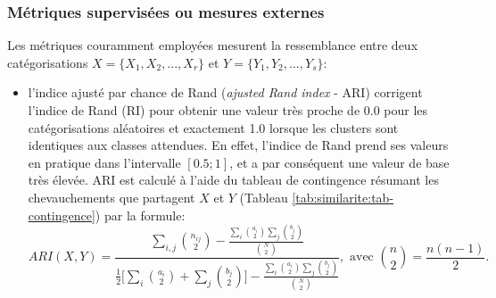 \subsubsection{Métriques supervisées ou mesures externes}
\label{sec:similarite:biblio:supeval}
Les métriques couramment employées mesurent la ressemblance entre deux catégorisations $X = \lbrace X_1, X_2,..., X_r \rbrace$ et $Y = \lbrace Y_1,Y_2,..., Y_s \rbrace$:
\begin{itemize}
	\item l'indice ajusté par chance de Rand (\textit{ajusted Rand index} - ARI) \citep{hubert1985adjustedrandidx} corrigent l'indice de Rand (RI) \citep{rand1971randidx} pour obtenir une valeur très proche de 0.0 pour les catégorisations aléatoires et exactement 1.0 lorsque les clusters sont identiques aux classes attendues. En effet, l'indice de Rand prend ses valeurs en pratique dans l'intervalle $[0.5;1]$, et a par conséquent une valeur de base très élevée. ARI est calculé à l'aide du tableau de contingence résumant les chevauchements que partagent $X$ et $Y$ (Tableau \ref{tab:similarite:tab-contingence}) par la formule: %
	\[ARI(X,Y) = \frac{\sum\limits_{i,j}\binom{n_{ij}}{2} - \frac{\sum\limits_{i}\binom{a_{i}}{2}\sum\limits_{j}\binom{b_{j}}{2}}{\binom{N}{2}}}{\frac{1}{2}\big[\sum\limits_{i}\binom{a_{i}}{2}+\sum\limits_{j}\binom{b_{j}}{2}\big] - \frac{\sum\limits_{i}\binom{a_{i}}{2}\sum\limits_{j}\binom{b_{j}}{2}}{\binom{N}{2}}}, \text{ avec } \binom{n}{2} = \frac{n(n-1)}{2}.\]
	

\end{itemize}
